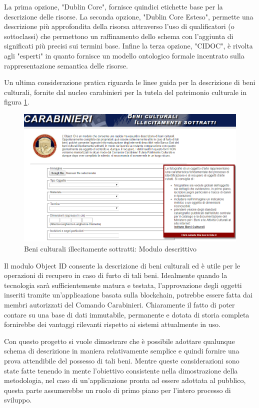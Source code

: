 La prima opzione, "Dublin Core", fornisce quindici etichette base per la descrizione delle risorse. La seconda opzione, "Dublin Core Esteso", permette una descrizione più approfondita della risorsa attraverso l'uso di qualificatori (o sottoclassi) che permettono un raffinamento dello schema con l'aggiunta di significati più precisi sui termini base. Infine la terza opzione, "CIDOC", è rivolta agli "esperti" in quanto fornisce un modello ontologico formale incentrato sulla rappresentazione semantica delle risorse.

Un ultima considerazione pratica riguarda le linee guida per la descrizione di beni culturali, fornite dal nucleo carabinieri per la tutela del patrimonio culturale in figura \ref{fig:carabinieriTPC}.

\begin{figure}[H]
\centering
\includegraphics[width=1\textwidth]{immagini/carabinieriTPC2.png}
\caption{Beni culturali illecitamente sottratti: Modulo descrittivo}
\label{fig:carabinieriTPC}
\end{figure}

Il modulo Object ID consente la descrizione di beni culturali ed è utile per le operazioni di recupero in caso di furto di tali beni. Idealmente quando la tecnologia sarà sufficientemente matura e testata, l'approvazione degli oggetti inseriti tramite un'applicazione basata sulla blockchain, potrebbe essere fatta dai membri autorizzati del Comando Carabinieri. Chiaramente il fatto di poter contare su una base di dati immutabile, permanente e dotata di storia completa fornirebbe dei vantaggi rilevanti rispetto ai sistemi attualmente in uso.

Con questo progetto si vuole dimostrare che è possibile adottare qualunque schema di descrizione in maniera relativamente semplice e quindi fornire una prova attendibile del possesso di tali beni. Mentre queste considerazioni sono state fatte tenendo in mente l'obiettivo consistente nella dimostrazione della metodologia, nel caso di un’applicazione pronta ad essere adottata al pubblico, questa parte assumerebbe un ruolo di primo piano per l'intero processo di sviluppo.

